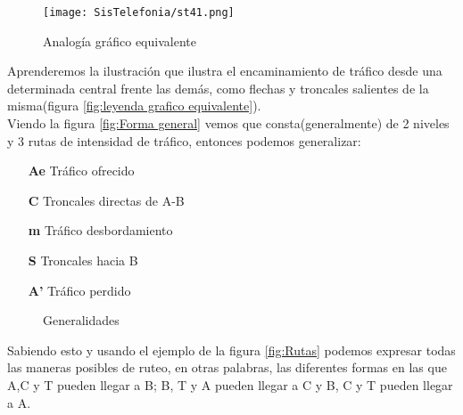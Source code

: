 \documentclass[
	11pt, %
	fleqn, %
	a4paper, %
]{LegrandOrangeBook}
\begin{document}
\begin{figure}[H]
\centering\texttt{[image: SisTelefonia/st41.png]}
\caption{Analogía gráfico equivalente}
\label{fig:analogia}
\end{figure}
Aprenderemos la ilustración que ilustra el encaminamiento de tráfico desde una determinada central frente las demás, como flechas y troncales salientes de la misma(figura \ref{fig:leyenda grafico equivalente}). \\
Viendo la figura \ref{fig:Forma general} vemos que consta(generalmente) de 2 niveles y 3 rutas de intensidad de tráfico, entonces podemos generalizar:
\begin{itemize}
\item[\textbf{Ae}] Tráfico ofrecido
\item[\textbf{C}] Troncales directas de A-B
\item[\textbf{m}]  Tráfico desbordamiento
\item[\textbf{S}] Troncales hacia B
\item[\textbf{A'}] Tráfico perdido
\end{itemize}
\begin{figure}[H]
\centering
{}
\caption{Generalidades}
\end{figure}
Sabiendo esto y usando el ejemplo de la figura \ref{fig:Rutas} podemos expresar todas las maneras posibles de ruteo, en otras palabras, las diferentes formas en las que A,C y T pueden llegar a B; B, T y A pueden llegar a C y B, C y T pueden llegar a A.
\end{document}
